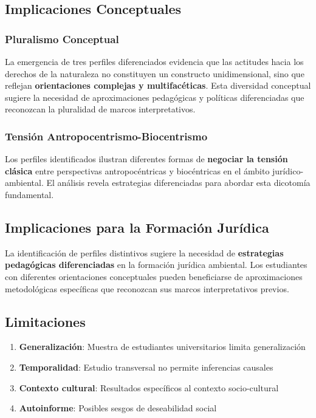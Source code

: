 \documentclass[
  11pt,
  letterpaper,
  DIV=11,
  numbers=noendperiod]{scrartcl}
\providecommand{\tightlist}{%
  \setlength{\itemsep}{0pt}\setlength{\parskip}{0pt}}
\begin{document}
\subsection{Implicaciones
Conceptuales}\label{implicaciones-conceptuales}

\subsubsection{Pluralismo Conceptual}\label{pluralismo-conceptual}

La emergencia de tres perfiles diferenciados evidencia que las actitudes
hacia los derechos de la naturaleza no constituyen un constructo
unidimensional, sino que reflejan \textbf{orientaciones complejas y
multifacéticas}. Esta diversidad conceptual sugiere la necesidad de
aproximaciones pedagógicas y políticas diferenciadas que reconozcan la
pluralidad de marcos interpretativos.

\subsubsection{Tensión
Antropocentrismo-Biocentrismo}\label{tensiuxf3n-antropocentrismo-biocentrismo}

Los perfiles identificados ilustran diferentes formas de
\textbf{negociar la tensión clásica} entre perspectivas antropocéntricas
y biocéntricas en el ámbito jurídico-ambiental. El análisis revela
estrategias diferenciadas para abordar esta dicotomía fundamental.

\subsection{Implicaciones para la Formación
Jurídica}\label{implicaciones-para-la-formaciuxf3n-juruxeddica}

La identificación de perfiles distintivos sugiere la necesidad de
\textbf{estrategias pedagógicas diferenciadas} en la formación jurídica
ambiental. Los estudiantes con diferentes orientaciones conceptuales
pueden beneficiarse de aproximaciones metodológicas específicas que
reconozcan sus marcos interpretativos previos.

\subsection{Limitaciones}\label{limitaciones}

\begin{enumerate}
\def\labelenumi{\arabic{enumi}.}
\tightlist
\item
  \textbf{Generalización}: Muestra de estudiantes universitarios limita
  generalización
\item
  \textbf{Temporalidad}: Estudio transversal no permite inferencias
  causales\\
\item
  \textbf{Contexto cultural}: Resultados específicos al contexto
  socio-cultural
\item
  \textbf{Autoinforme}: Posibles sesgos de deseabilidad social
\end{enumerate}
\end{document}
